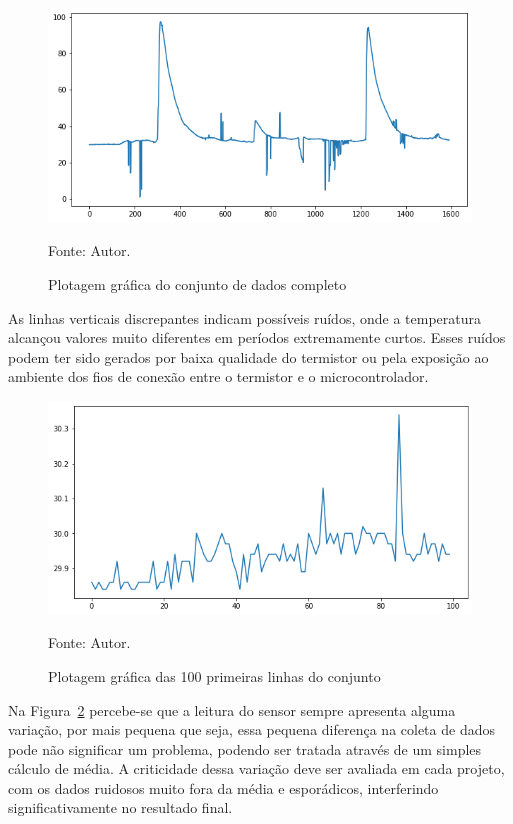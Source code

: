 \begin{figure}[H]
	\centering
	\includegraphics[width=15cm]{imagens/sensores/bruto.png}
	\caption{Plotagem gráfica do conjunto de dados completo}
	Fonte: Autor.
	\label{fig: bruto}
\end{figure}

As linhas verticais discrepantes indicam possíveis ruídos, onde a temperatura alcançou valores muito diferentes em períodos extremamente curtos. Esses ruídos podem ter sido gerados por baixa qualidade do termistor ou pela exposição ao ambiente dos fios de conexão entre o termistor e o microcontrolador.


\begin{figure}[H]
	\centering
	\includegraphics[width=15cm]{imagens/sensores/bruto_100_primeiras}
	\caption{Plotagem gráfica das 100 primeiras linhas do conjunto}
	Fonte: Autor.
	\label{fig: bruto_100p}
\end{figure}

Na Figura~\ref{fig: bruto_100p} percebe-se que a leitura do sensor sempre apresenta alguma variação, por mais pequena que seja, essa pequena diferença na coleta de dados pode não significar um problema, podendo ser tratada através de um simples cálculo de média. A criticidade dessa variação deve ser avaliada em cada projeto, com os dados ruidosos muito fora da média e esporádicos, interferindo significativamente no resultado final.

